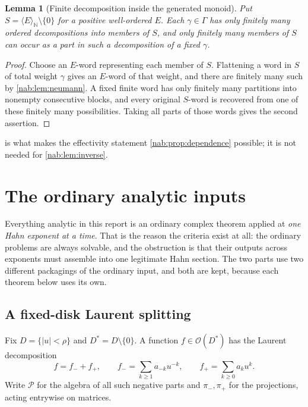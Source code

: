 \documentclass[11pt,letterpaper]{article}
\newtheorem{lemma}[lemma]{Lemma}
\theoremstyle{definition}
\theoremstyle{remark}
\newcommand{\N}{\mathbb N}
\newcommand{\OO}{\mathcal O}
\newcommand{\PP}{\mathcal P}
\newcommand{\angles}[1]{\langle #1\rangle_{\N}}
\numberwithin{equation}{section}
\begin{document}
\begin{lemma}[Finite decomposition inside the generated monoid]
\label{nab:lem:finiteclosure}
Put $S=\angles E\setminus\{0\}$ for a positive well-ordered $E$. Each
$\gamma\in\Gamma$ has only finitely many ordered decompositions into members
of $S$, and only finitely many members of $S$ can occur as a part in such a
decomposition of a fixed $\gamma$.
\end{lemma}

\begin{proof}
Choose an $E$-word representing each member of $S$. Flattening a word in $S$
of total weight $\gamma$ gives an $E$-word of that weight, and there are
finitely many such by \cref{nab:lem:neumann}. A fixed finite word has only
finitely many partitions into nonempty consecutive blocks, and every original
$S$-word is recovered from one of these finitely many possibilities. Taking
all parts of those words gives the second assertion.
\end{proof}

 is what makes the effectivity statement
\cref{nab:prop:dependence} possible; it is not needed for
\cref{nab:lem:inverse}.
\section{The ordinary analytic inputs}\label{nab:sec:ordinary}

Everything analytic in this report is an ordinary complex theorem applied at
\emph{one Hahn exponent at a time}. That is the reason the criteria exist at
all: the ordinary problems are always solvable, and the obstruction is that
their outputs across exponents must assemble into one legitimate Hahn
section. The two parts use two different packagings of the ordinary input, and
both are kept, because each theorem below uses its own.

\subsection{A fixed-disk Laurent splitting}

Fix $D=\{|u|<\rho\}$ and $D^*=D\setminus\{0\}$. A function $f\in\OO(D^*)$ has
the Laurent decomposition
\begin{equation}\label{nab:eq:Laurent}
 f=f_-+f_+,\qquad
 f_-=\sum_{k\geq1}a_{-k}u^{-k},\qquad
 f_+=\sum_{k\geq0}a_ku^k.
\end{equation}
Write $\PP$ for the algebra of all such negative parts and $\pi_-,\pi_+$ for
the projections, acting entrywise on matrices.
\end{document}
